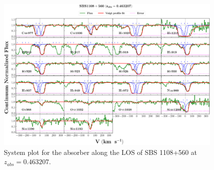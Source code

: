  
  
  \newpage
  \thispagestyle{empty}

  \begin{landscape}
  
  \begin{figure}
      \centering
      \vspace{-10mm}
      \hspace*{-20mm}
      \includegraphics[width=1.1\linewidth]{System-Plots/SBS1108+560_z=0.463207_sys_plot.png}
      \caption{System plot for the absorber along the LOS of SBS 1108+560 at $z_{abs} = 0.463207$. }
  \end{figure}
  
  \end{landscape}
  
